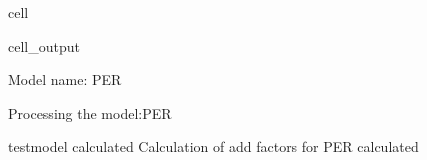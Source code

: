 \documentclass[letterpaper,10pt,english]{jupyterBook}
\begin{document}
\begin{sphinxuseclass}{cell}
\begin{sphinxVerbatimOutput}
\begin{sphinxuseclass}{cell_output}
\begin{sphinxVerbatim}[commandchars=\\\{\}]
Model name: PER
\end{sphinxVerbatim}

\begin{sphinxVerbatim}[commandchars=\\\{\}]
Processing the model:PER
\end{sphinxVerbatim}

\begin{sphinxVerbatim}[commandchars=\\\{\}]
testmodel calculated  
Calculation of add factors for PER calculated  
\end{sphinxVerbatim}

\end{sphinxuseclass}\end{sphinxVerbatimOutput}

\end{sphinxuseclass}
\end{document}
